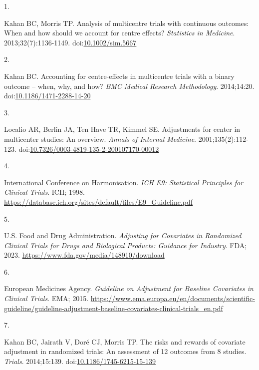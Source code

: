 \documentclass[
  11pt,
]{article}
\newlength{\cslhangindent}
\newlength{\csllabelwidth}
\newenvironment{CSLReferences}[2] %
 {\begin{list}{}{%
  \setlength{\itemindent}{0pt}
  \setlength{\leftmargin}{0pt}
  \setlength{\parsep}{0pt}
  \ifodd #1
   \setlength{\leftmargin}{\cslhangindent}
   \setlength{\itemindent}{-1\cslhangindent}
  \fi
  \setlength{\itemsep}{#2\baselineskip}}}
 {\end{list}}
\newcommand{\CSLLeftMargin}[1]{\parbox[t]{\csllabelwidth}{\strut#1\strut}}
\newcommand{\CSLRightInline}[1]{\parbox[t]{\linewidth - \csllabelwidth}{\strut#1\strut}}
\begin{document}
\protect{}\label{refs}
\begin{CSLReferences}{0}{1}
\CSLLeftMargin{1. }%
\CSLRightInline{Kahan BC, Morris TP. Analysis of multicentre trials with continuous outcomes: When and how should we account for centre effects? \emph{Statistics in Medicine}. 2013;32(7):1136-1149. doi:\href{https://doi.org/10.1002/sim.5667}{10.1002/sim.5667}}

\CSLLeftMargin{2. }%
\CSLRightInline{Kahan BC. Accounting for centre-effects in multicentre trials with a binary outcome -- when, why, and how? \emph{BMC Medical Research Methodology}. 2014;14:20. doi:\href{https://doi.org/10.1186/1471-2288-14-20}{10.1186/1471-2288-14-20}}

\CSLLeftMargin{3. }%
\CSLRightInline{Localio AR, Berlin JA, Ten Have TR, Kimmel SE. Adjustments for center in multicenter studies: An overview. \emph{Annals of Internal Medicine}. 2001;135(2):112-123. doi:\href{https://doi.org/10.7326/0003-4819-135-2-200107170-00012}{10.7326/0003-4819-135-2-200107170-00012}}

\CSLLeftMargin{4. }%
\CSLRightInline{International Conference on Harmonisation. \emph{{ICH} {E9}: Statistical Principles for Clinical Trials}. ICH; 1998. \url{https://database.ich.org/sites/default/files/E9_Guideline.pdf}}

\CSLLeftMargin{5. }%
\CSLRightInline{U.S. Food and Drug Administration. \emph{Adjusting for Covariates in Randomized Clinical Trials for Drugs and Biological Products: Guidance for Industry}. FDA; 2023. \url{https://www.fda.gov/media/148910/download}}

\CSLLeftMargin{6. }%
\CSLRightInline{European Medicines Agency. \emph{Guideline on Adjustment for Baseline Covariates in Clinical Trials}. EMA; 2015. \url{https://www.ema.europa.eu/en/documents/scientific-guideline/guideline-adjustment-baseline-covariates-clinical-trials_en.pdf}}

\CSLLeftMargin{7. }%
\CSLRightInline{Kahan BC, Jairath V, Doré CJ, Morris TP. The risks and rewards of covariate adjustment in randomized trials: An assessment of 12 outcomes from 8 studies. \emph{Trials}. 2014;15:139. doi:\href{https://doi.org/10.1186/1745-6215-15-139}{10.1186/1745-6215-15-139}}


\end{CSLReferences}
\end{document}
